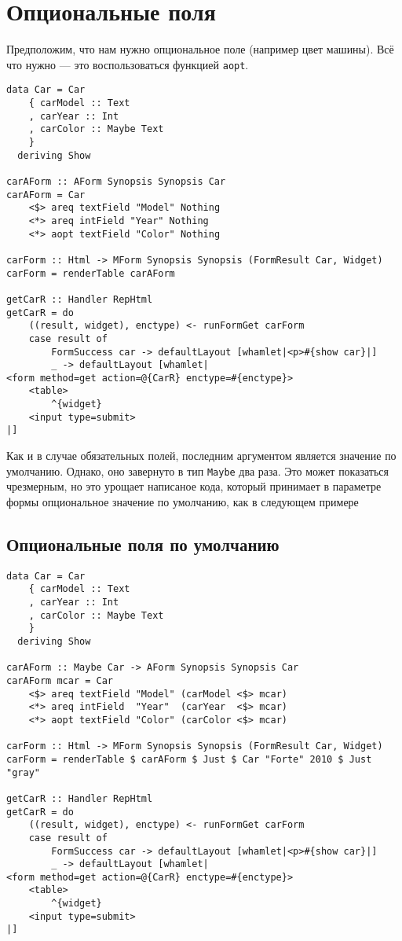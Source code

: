\section{Опциональные поля}
Предположим, что нам нужно опциональное поле (например цвет машины). Всё что нужно ---
это воспользоваться функцией \lstinline'aopt'.
\begin{remark}
\begin{lstlisting}
data Car = Car
    { carModel :: Text
    , carYear :: Int
    , carColor :: Maybe Text
    }
  deriving Show

carAForm :: AForm Synopsis Synopsis Car
carAForm = Car
    <$> areq textField "Model" Nothing
    <*> areq intField "Year" Nothing
    <*> aopt textField "Color" Nothing

carForm :: Html -> MForm Synopsis Synopsis (FormResult Car, Widget)
carForm = renderTable carAForm

getCarR :: Handler RepHtml
getCarR = do
    ((result, widget), enctype) <- runFormGet carForm
    case result of
        FormSuccess car -> defaultLayout [whamlet|<p>#{show car}|]
        _ -> defaultLayout [whamlet|
<form method=get action=@{CarR} enctype=#{enctype}>
    <table>
        ^{widget}
    <input type=submit>
|]
\end{lstlisting}
\end{remark}
Как и в случае обязательных полей, последним аргументом является значение по умолчанию.
Однако, оно завернуто в тип \lstinline'Maybe' два раза. Это может показаться чрезмерным,
но это урощает написаное кода, который принимает в параметре формы опциональное значение
по умолчанию, как в следующем примере

\subsection{Опциональные поля по умолчанию}

\begin{lstlisting}
data Car = Car
    { carModel :: Text
    , carYear :: Int
    , carColor :: Maybe Text
    }
  deriving Show

carAForm :: Maybe Car -> AForm Synopsis Synopsis Car
carAForm mcar = Car
    <$> areq textField "Model" (carModel <$> mcar)
    <*> areq intField  "Year"  (carYear  <$> mcar)
    <*> aopt textField "Color" (carColor <$> mcar)

carForm :: Html -> MForm Synopsis Synopsis (FormResult Car, Widget)
carForm = renderTable $ carAForm $ Just $ Car "Forte" 2010 $ Just "gray"

getCarR :: Handler RepHtml
getCarR = do
    ((result, widget), enctype) <- runFormGet carForm
    case result of
        FormSuccess car -> defaultLayout [whamlet|<p>#{show car}|]
        _ -> defaultLayout [whamlet|
<form method=get action=@{CarR} enctype=#{enctype}>
    <table>
        ^{widget}
    <input type=submit>
|]
\end{lstlisting}

